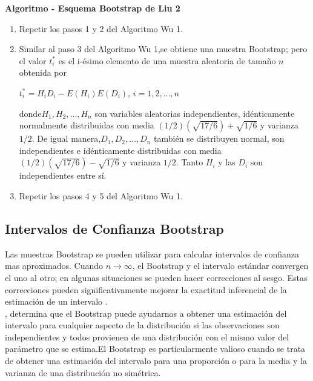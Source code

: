 \textbf{Algoritmo - Esquema Bootstrap de Liu 2}

\begin{enumerate}
	\item Repetir los pasos 1 y 2 del Algoritmo Wu 1.
	
	\item  Similar al paso 3 del Algoritmo Wu 1,se obtiene una muestra Bootstrap;
	pero el valor $t^{*}_{i}$ es el i-ésimo elemento de una muestra aleatoria de tamaño $n$ obtenida por 
	
	\begin{center}
		$t^{*}_{i} = H_{i}D_{i}- E(H_{i})E(D_{i})$,\hspace{.5cm} $i = 1,2, \dots, n$
	\end{center}
	
	donde$ H_{1},H_{2}, \dots,H_{n}$ son variables aleatorias independientes, idénticamente normalmente distribuidas con media $(1/2)( \sqrt{17/6})+ \sqrt{1/6}$ y varianza $1/2$. De igual manera,$ D_{1},D_{2}, \dots,D_{n}$ también se distribuyen normal, son independientes e idénticamente
	distribuidas con media $(1/2)( \sqrt{17/6})- \sqrt{1/6}$ y varianza  $1/2$. Tanto $ H_{i}$ y las $ D_{i}$ son independientes entre sí.
	
	\item Repetir los pasos 4 y 5 del Algoritmo Wu 1.
\end{enumerate}



\subsection{Intervalos de Confianza Bootstrap}
Las muestras Bootstrap se pueden utilizar para calcular intervalos de confianza mas aproximados. Cuando $n \rightarrow \infty$, el Bootstrap y el intervalo estándar convergen el uno al otro; en algunas situaciones se pueden hacer correcciones al sesgo. Estas correcciones pueden significativamente mejorar la exactitud inferencial de la estimación de un intervalo \parencite{efron-tibs-1993}.\\


\textcite{good-2005}, determina que el Bootstrap puede ayudarnos a obtener una estimación del intervalo para cualquier aspecto de la distribución si las observaciones son independientes y todos provienen de una distribución con el mismo valor del parámetro que se estima.El Bootstrap es particularmente valioso cuando se trata de obtener una estimación del intervalo para una proporción o para la media y la varianza de una distribución no simétrica.\\


